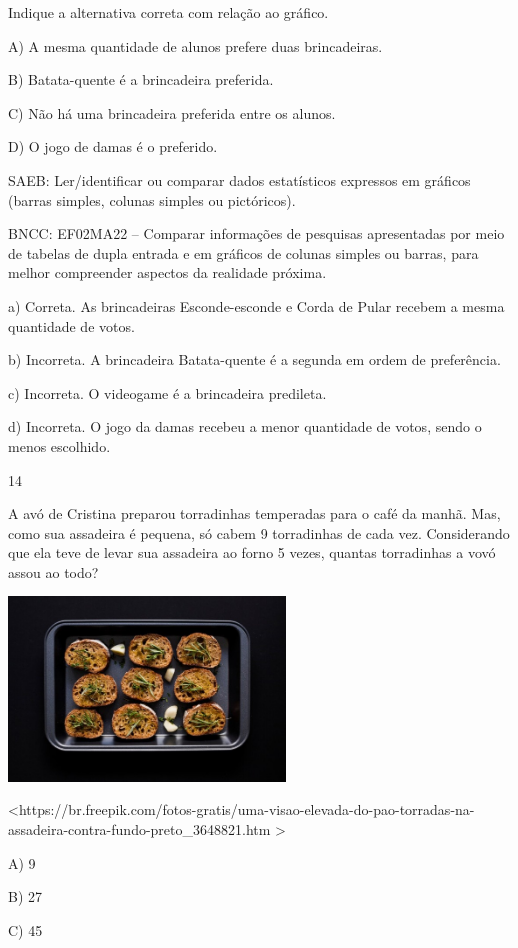 \begin{escolha}
\begin{escolha}
{{{{Indique a alternativa correta com relação ao gráfico.

A) A mesma quantidade de alunos prefere duas brincadeiras.

B) Batata-quente é a brincadeira preferida.

C) Não há uma brincadeira preferida entre os alunos.

D) O jogo de damas é o preferido.

SAEB: Ler/identificar ou comparar dados estatísticos expressos
em gráficos (barras simples, colunas simples ou pictóricos).

BNCC: EF02MA22 -- Comparar informações de pesquisas apresentadas por meio
de tabelas de dupla entrada e em gráficos de colunas simples ou barras,
para melhor compreender aspectos da realidade próxima.

a) Correta. As brincadeiras Esconde-esconde e Corda de Pular
recebem a mesma quantidade de votos.

b) Incorreta. A brincadeira Batata-quente é a segunda em ordem de
preferência.

c) Incorreta. O videogame é a brincadeira predileta.

d) Incorreta. O jogo da damas recebeu a menor quantidade de votos,
sendo o menos escolhido.

\num{14}

A avó de Cristina preparou torradinhas temperadas para o café da manhã.
Mas, como sua assadeira é pequena, só cabem 9 torradinhas de cada vez.
Considerando que ela teve de levar sua assadeira ao forno 5 vezes,
quantas torradinhas a vovó assou ao todo?

\includegraphics[width=2.89583in,height=1.93056in]{media/image172.jpeg}

\textless{}https://br.freepik.com/fotos-gratis/uma-visao-elevada-do-pao-torradas-na-assadeira-contra-fundo-preto\_3648821.htm
\textgreater{}

A) 9

B) 27

C) 45

}}}}
\end{escolha}
\end{escolha}
